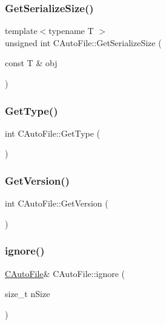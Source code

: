 \subsubsection{\texorpdfstring{Get\+Serialize\+Size()}{GetSerializeSize()}}
{\footnotesize\ttfamily template$<$typename T $>$ \\
unsigned int C\+Auto\+File\+::\+Get\+Serialize\+Size (\begin{DoxyParamCaption}\item[{const T \&}]{obj }\end{DoxyParamCaption})\hspace{0.3cm}{\ttfamily [inline]}}

\mbox{\label{class_c_auto_file_a774f2aad2c462d4ff47125ceec2ebab0}} 
\subsubsection{\texorpdfstring{Get\+Type()}{GetType()}}
{\footnotesize\ttfamily int C\+Auto\+File\+::\+Get\+Type (\begin{DoxyParamCaption}{ }\end{DoxyParamCaption})\hspace{0.3cm}{\ttfamily [inline]}}

\mbox{\label{class_c_auto_file_a976ab8e5477aedd3a531fc49b01153ce}} 
\subsubsection{\texorpdfstring{Get\+Version()}{GetVersion()}}
{\footnotesize\ttfamily int C\+Auto\+File\+::\+Get\+Version (\begin{DoxyParamCaption}{ }\end{DoxyParamCaption})\hspace{0.3cm}{\ttfamily [inline]}}

\mbox{\label{class_c_auto_file_a0159b896d7ed2574cc32663987bfc0ce}} 
\subsubsection{\texorpdfstring{ignore()}{ignore()}}
{\footnotesize\ttfamily \mbox{\hyperlink{class_c_auto_file}{C\+Auto\+File}}\& C\+Auto\+File\+::ignore (\begin{DoxyParamCaption}\item[{size\+\_\+t}]{n\+Size }\end{DoxyParamCaption})\hspace{0.3cm}{\ttfamily [inline]}}

